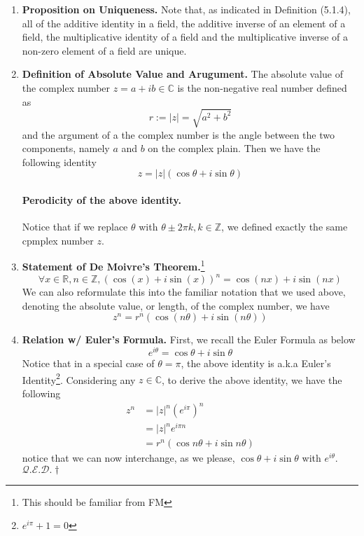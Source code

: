 \documentclass[oneside, 12pt]{book}
\newcommand{\settag}[1]{\renewcommand{\theenumi}{#1}}
\newcommand{\R}{\mathbb{R}}
\newcommand{\complex}{\mathbb{C}}
\newcommand{\qed}{\hfill $\mathcal{Q}.\mathcal{E}.\mathcal{D}.\dagger$}
\newcommand{\tbf}[1]{\textbf{#1}}
\newcommand{\para}[1]{\item \tbf{#1}}
\begin{document}
\begin{enumerate}
    \settag{5.1.7}
    \para{Proposition on Uniqueness.} Note that, as indicated in Definition (5.1.4), all of the additive identity in a field, 
    the additive inverse of an element of a field, the multiplicative identity of a field and the multiplicative inverse of a 
    non-zero element of a field are unique.

    \settag{5.1.8}
    \para{Definition of Absolute Value and Arugument.} The absolute value of the complex number $z = a + ib\in \complex$
    is the non-negative real number defined as
    \begin{equation*}
        r := |z| = \sqrt{a^2 + b^2}
    \end{equation*}
    and the argument of a the complex number is the angle between the two components, namely $a$ and $b$
    on the complex plain. Then we have the following identity
    \begin{equation*}
        z = |z|(\cos \theta + i\sin \theta)
    \end{equation*}
    \paragraph{Perodicity of the above identity.} Notice that if we replace $\theta$ with $\theta \pm
    2\pi k, k\in \mathbb{Z}$, we defined exactly the same cpmplex number $z$. 

    \settag{5.1.9}
    \para{Statement of De Moivre's Theorem.}\footnote{This should be familiar from FM}
    \begin{equation*}
        \forall x\in \R, n\in \mathbb{Z}, \left(\cos(x) + i\sin(x)\right)^n = \cos(nx) + i\sin(nx)
    \end{equation*}
    We can also reformulate this into the familiar notation that we used above, denoting the absolute
    value, or length, of the complex number, we have
    \begin{equation*}
        z^n = r^n\left(\cos(n\theta) + i\sin(n\theta)\right)
    \end{equation*}

    \settag{5.1.9*}
    \para{Relation w/ Euler's Formula.} First, we recall the Euler Formula as below
    \begin{equation*}
        e^{i\theta} = \cos \theta + i\sin \theta
    \end{equation*}
    Notice that in a special case of $\theta = \pi$, the above identity is a.k.a Euler's 
    Identity\footnote{$e^{i\pi}+1=0$}. Considering any $z\in \complex$, to derive the above identity, we have the following
    \begin{align*}
        z^n &= |z|^n\left(e^{i\pi}\right)^n\\
        &= |z|^ne^{i\pi n} \\
        &= r^n\left(\cos n\theta + i\sin n \theta\right)
    \end{align*}
    notice that we can now interchange, as we please, $\cos \theta + i\sin \theta$ with $e^{i\theta}$. \qed


\end{enumerate}
\end{document}
